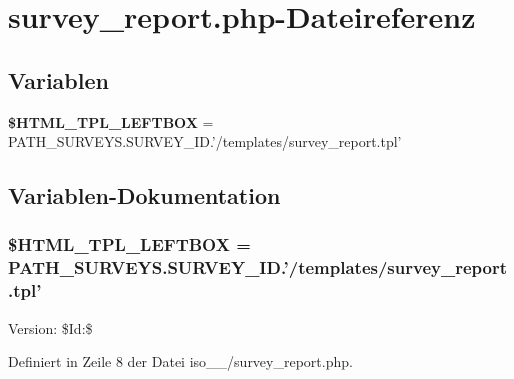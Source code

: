 \section{survey\_\-report.php-Dateireferenz}
\label{iso__9241__10_2survey__report_8php}
\subsection*{Variablen}
\begin{CompactItemize}
\item 
{\bf \$HTML\_\-TPL\_\-LEFTBOX} = PATH\_\-SURVEYS.SURVEY\_\-ID.'/templates/survey\_\-report.tpl'
\end{CompactItemize}


\subsection{Variablen-Dokumentation}
\subsubsection{\setlength{\rightskip}{0pt plus 5cm}\$HTML\_\-TPL\_\-LEFTBOX = PATH\_\-SURVEYS.SURVEY\_\-ID.'/templates/survey\_\-report.tpl'}\label{iso__9241__10_2survey__report_8php_19d93cdfaed5a4e939eae3d2d5c455af}


\begin{Desc}
\item[Version:]\$Id:\$ \end{Desc}


Definiert in Zeile 8 der Datei iso\_\_/survey\_\-report.php.